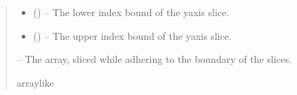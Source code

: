 \documentclass[letterpaper,11pt,english]{sphinxmanual}
\begin{document}
\begin{savenotes}
\begin{fulllineitems}
\begin{quote}
\begin{description}
\begin{itemize}
\item {} 
\sphinxAtStartPar
{} () – The lower index bound of the y\sphinxhyphen{}axis slice.

\item {} 
\sphinxAtStartPar
{} () – The upper index bound of the y\sphinxhyphen{}axis slice.

\end{itemize}

\sphinxAtStartPar
{} – The array, sliced while adhering to the boundary of the slices.

\sphinxAtStartPar
array\sphinxhyphen{}like

\end{description}\end{quote}

\end{fulllineitems}\end{savenotes}

\end{document}
